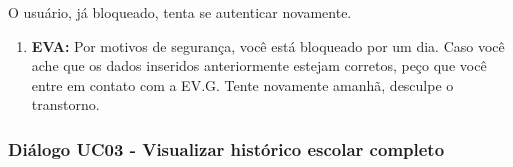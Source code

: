 \begin{itemize}
        O usuário, já bloqueado, tenta se autenticar novamente.
        \begin{enumerate}
            \item \textbf{EVA:} Por motivos de segurança, você está bloqueado por um dia. Caso você ache que os dados inseridos anteriormente estejam corretos, peço que você entre em contato com a EV.G. Tente novamente amanhã, desculpe o transtorno.
        \end{enumerate}
    
\end{itemize}

\subsubsection{Diálogo UC03 - Visualizar histórico escolar completo}

